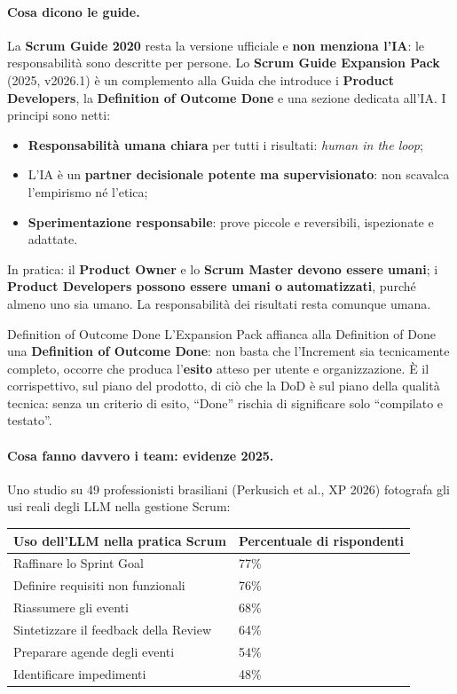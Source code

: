 \documentclass[12pt]{extarticle}
\begin{document}
\paragraph{Cosa dicono le guide.}
La \textbf{Scrum Guide 2020} resta la versione ufficiale e \textbf{non menziona l'IA}: le responsabilità sono descritte per persone. Lo \textbf{Scrum Guide Expansion Pack} (2025, v2026.1) è un complemento alla Guida che introduce i \textbf{Product Developers}, la \textbf{Definition of Outcome Done} e una sezione dedicata all'IA. I principi sono netti:
\begin{itemize}
    \item \textbf{Responsabilità umana chiara} per tutti i risultati: \textit{human in the loop};
    \item L'IA è un \textbf{partner decisionale potente ma supervisionato}: non scavalca l'empirismo né l'etica;
    \item \textbf{Sperimentazione responsabile}: prove piccole e reversibili, ispezionate e adattate.
\end{itemize}
\noindent In pratica: il \textbf{Product Owner} e lo \textbf{Scrum Master devono essere umani}; i \textbf{Product Developers possono essere umani o automatizzati}, purché almeno uno sia umano. La responsabilità dei risultati resta comunque umana.

\begin{cbox}{Definition of Outcome Done}
L'Expansion Pack affianca alla Definition of Done una \textbf{Definition of Outcome Done}: non basta che l'Increment sia tecnicamente completo, occorre che produca l'\textbf{esito} atteso per utente e organizzazione. È il corrispettivo, sul piano del prodotto, di ciò che la DoD è sul piano della qualità tecnica: senza un criterio di esito, ``Done'' rischia di significare solo ``compilato e testato''.
\end{cbox}

\paragraph{Cosa fanno davvero i team: evidenze 2025.}
Uno studio su 49 professionisti brasiliani (Perkusich et al., XP 2026) fotografa gli usi reali degli LLM nella gestione Scrum:

\begin{center}
\small
\begin{tabular}{p{9.2cm}p{5.0cm}}
    \toprule
    \textbf{Uso dell'LLM nella pratica Scrum} & \textbf{Percentuale di rispondenti} \\
    \midrule
    Raffinare lo Sprint Goal & 77\% \\
    Definire requisiti non funzionali & 76\% \\
    Riassumere gli eventi & 68\% \\
    Sintetizzare il feedback della Review & 64\% \\
    Preparare agende degli eventi & 54\% \\
    Identificare impedimenti & 48\% \\
    \bottomrule
\end{tabular}
\end{center}
\end{document}
